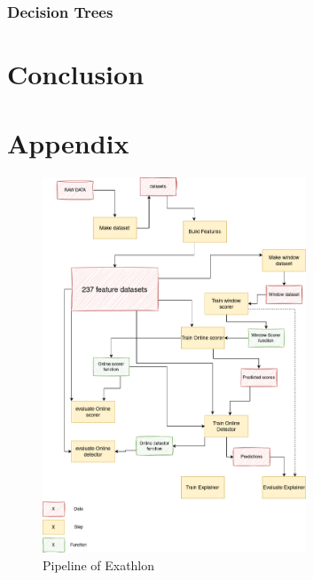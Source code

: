 \documentclass[oneside, a4paper, onecolumn, 11pt]{article}
\begin{document}
\subsubsection{Decision Trees}
\section{Conclusion}

\newpage



\newpage
\appendix

\section{Appendix}
\label{sec:appendix}


\begin{figure}[h]
    \centering
    \includegraphics[width=0.7\textwidth]{images/pipeline.drawio.png} %
    \caption{Pipeline of Exathlon}
    \label{fig:pipeline}
\end{figure}
\end{document}
